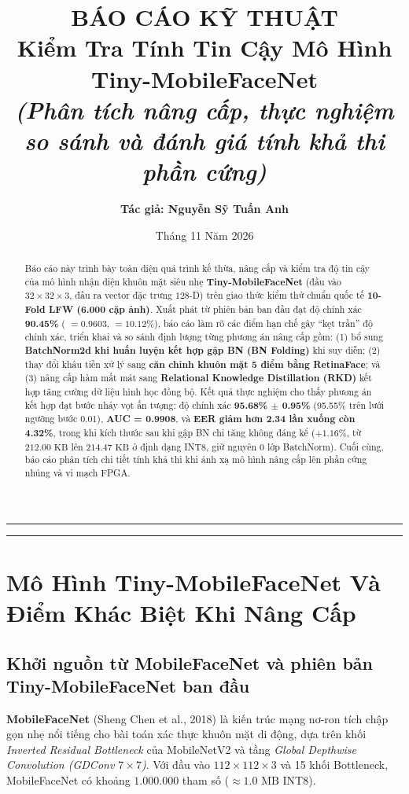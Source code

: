 \documentclass[11pt,a4paper]{article}
\title{
    \vspace{-1.4cm}
    \textbf{\LARGE BÁO CÁO KỸ THUẬT}\\[0.4em]
    \textbf{\huge Kiểm Tra Tính Tin Cậy Mô Hình Tiny-MobileFaceNet}\\[0.3em]
    \large\textit{(Phân tích nâng cấp, thực nghiệm so sánh và đánh giá tính khả thi phần cứng)}
}
\author{\textbf{Tác giả: Nguyễn Sỹ Tuấn Anh}}
\date{Tháng 11 Năm 2026}
\begin{document}
\maketitle
\thispagestyle{empty}
\hrule
\vspace{0.8em}

\begin{abstract}
Báo cáo này trình bày toàn diện quá trình kế thừa, nâng cấp và kiểm tra độ tin cậy của mô hình nhận diện khuôn mặt siêu nhẹ \textbf{Tiny-MobileFaceNet} (đầu vào $32 \times 32 \times 3$, đầu ra vector đặc trưng $128$-D) trên giao thức kiểm thử chuẩn quốc tế \textbf{10-Fold LFW (6.000 cặp ảnh)}. Xuất phát từ phiên bản ban đầu đạt độ chính xác \textbf{90.45\%} ( $= 0.9603$,  $= 10.12\%$), báo cáo làm rõ các điểm hạn chế gây ``kẹt trần'' độ chính xác, triển khai và so sánh định lượng từng phương án nâng cấp gồm: (1) bổ sung \textbf{BatchNorm2d khi huấn luyện kết hợp gập BN (BN Folding)} khi suy diễn; (2) thay đổi khâu tiền xử lý sang \textbf{căn chỉnh khuôn mặt 5 điểm bằng RetinaFace}; và (3) nâng cấp hàm mất mát sang \textbf{Relational Knowledge Distillation (RKD)} kết hợp tăng cường dữ liệu hình học đồng bộ. Kết quả thực nghiệm cho thấy phương án kết hợp đạt bước nhảy vọt ấn tượng: độ chính xác \textbf{95.68\% $\pm$ 0.95\%} (95.55\% trên lưới ngưỡng bước 0.01), \textbf{AUC = 0.9908}, và \textbf{EER giảm hơn 2.34 lần xuống còn 4.32\%}, trong khi kích thước sau khi gập BN chỉ tăng không đáng kể ($+1.16\%$, từ $212.00\text{ KB}$ lên $214.47\text{ KB}$ ở định dạng INT8, giữ nguyên 0 lớp BatchNorm). Cuối cùng, báo cáo phân tích chi tiết tính khả thi khi ánh xạ mô hình nâng cấp lên phần cứng nhúng và vi mạch FPGA.
\end{abstract}

\vspace{0.5em}
\hrule
\vspace{1.2em}

\section{Mô Hình Tiny-MobileFaceNet Và Điểm Khác Biệt Khi Nâng Cấp}

\subsection{Khởi nguồn từ MobileFaceNet và phiên bản Tiny-MobileFaceNet ban đầu}
\textbf{MobileFaceNet} (Sheng Chen et al., 2018) là kiến trúc mạng nơ-ron tích chập gọn nhẹ nổi tiếng cho bài toán xác thực khuôn mặt di động, dựa trên khối \textit{Inverted Residual Bottleneck} của MobileNetV2 và tầng \textit{Global Depthwise Convolution (GDConv $7 \times 7$)}. Với đầu vào $112 \times 112 \times 3$ và 15 khối Bottleneck, MobileFaceNet có khoảng $1.000.000$ tham số ($\approx 1.0\text{ MB}$ INT8).
\end{document}
